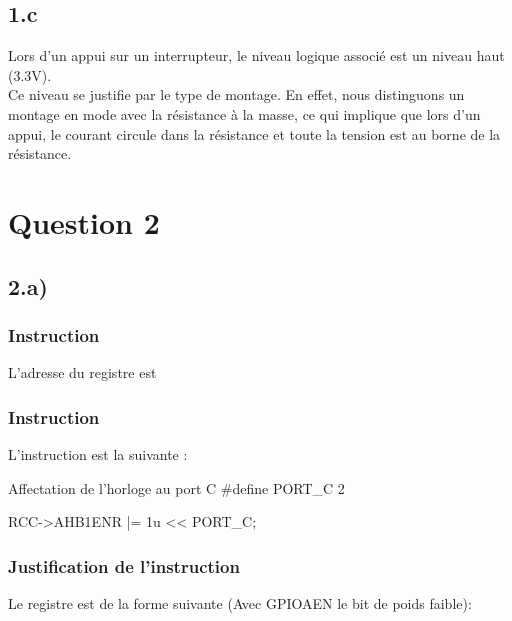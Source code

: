 \subsection{1.c}

Lors d'un appui sur un interrupteur, le niveau logique associé est un niveau haut (3.3V). \\
Ce niveau se justifie par le type de montage. En effet, nous distinguons un montage en mode  
avec la résistance à la masse, ce qui implique que lors d'un appui, le courant circule dans
la résistance et toute la tension est au borne de la résistance.


\section{Question 2}

\subsection{2.a)}
\subsubsection*{Instruction}
L'adresse du registre  est 

\subsubsection{Instruction}
L'instruction est la suivante : 

\begin{Cpp}{Affectation de l'horloge au port C}
#define PORT_C 2

RCC->AHB1ENR |= 1u << PORT_C;	
\end{Cpp}
\subsubsection{Justification de l'instruction}

Le registre  est de la forme suivante (Avec GPIOAEN le bit de poids faible): \\
     \\
    \quad\quad \quad\quad {}   \quad\quad \quad\quad          {}    \quad\quad \quad\quad  {}    \quad\quad \quad\quad{}\\



